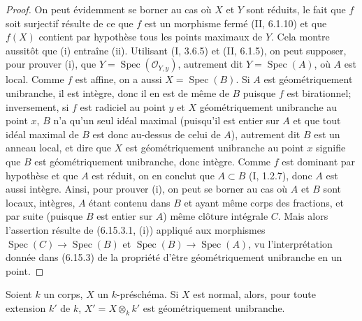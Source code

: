 \begin{proof}
On peut évidemment se borner au cas où $X$ et $Y$ sont réduits, le fait
que $f$ soit surjectif résulte de ce que $f$ est un morphisme fermé (II,
6.1.10) et que $f(X)$ contient par hypothèse tous les points maximaux de
$Y$. Cela montre aussitôt que (i) entraîne (ii). Utilisant (I, 3.6.5) et
(II, 6.1.5), on peut supposer, pour prouver (i), que
$Y=\operatorname{Spec}(\mathcal O_{Y,y})$, autrement dit
$Y=\operatorname{Spec}(A)$, où $A$ est local. Comme $f$ est affine, on a
aussi $X=\operatorname{Spec}(B)$. Si $A$ est géométriquement unibranche,
il est intègre, donc il en est de même de $B$ puisque $f$ est birationnel;
inversement, si $f$ est radiciel au point $y$ et $X$ géométriquement
unibranche au point $x$, $B$ n'a qu'un seul idéal maximal (puisqu'il est
entier sur $A$ et que tout idéal maximal de $B$ est donc au-dessus de celui
de $A$), autrement dit $B$ est un anneau local, et dire que $X$ est
géométriquement unibranche au point $x$ signifie que $B$ est
géométriquement unibranche, donc intègre. Comme $f$ est dominant par
hypothèse et que $A$ est réduit, on en conclut que $A\subset B$ (I,
1.2.7), donc $A$ est aussi intègre. Ainsi, pour prouver (i), on peut se
borner au cas où $A$ et $B$ sont locaux, intègres, $A$ étant contenu dans
$B$ et ayant même corps des fractions, et par suite (puisque $B$ est entier
sur $A$) même clôture intégrale $C$. Mais alors l'assertion résulte de
(6.15.3.1, (i)) appliqué aux morphismes
$\operatorname{Spec}(C)\to\operatorname{Spec}(B)$ et
$\operatorname{Spec}(B)\to\operatorname{Spec}(A)$, vu l'interprétation
donnée dans (6.15.3) de la propriété d'être géométriquement unibranche en
un point.
\end{proof}

\begin{proposition}[6.15.6]
\label{IV.2.s6.15.6-fr}
Soient $k$ un corps, $X$ un $k$-préschéma. Si $X$ est normal, alors, pour
toute extension $k'$ de $k$, $X'=X\otimes_k k'$ est géométriquement
unibranche.
\end{proposition}

